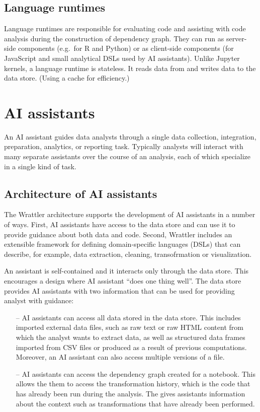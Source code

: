 \documentclass[sigplan,preprint,10pt]{acmart}\settopmatter{printfolios=true,printccs=false,printacmref=false}
\theoremstyle{plain}
\theoremstyle{definition}
\begin{document}
\subsection{Language runtimes}

Language runtimes are responsible for evaluating code and assisting with code analysis during
the construction of dependency graph. They can run as server-side components (e.g.~for R and Python) 
or as client-side components (for JavaScript and small analytical DSLs used by AI assistants). 
Unlike Jupyter kernels, a language runtime is stateless. It reads data from and writes data to
the data store. (Using a cache for efficiency.)

\section{AI assistants}
\label{sec:ai}

An AI assistant guides data analysts through a single data collection, integration, preparation, 
analytics, or reporting task. Typically analysts will interact with many separate assistants over 
the course of an analysis, each of which specialize in a single kind of task.

\subsection{Architecture of AI assistants}

The Wrattler architecture supports the development of AI assistants in a number of ways. First, AI
assistants have access to the data store and can use it to provide guidance about both data and 
code. Second, Wrattler includes an extensible framework for defining domain-specific languages 
(DSLs) that can describe, for example, data extraction, cleaning, transofrmation or visualization.

An assistant is self-contained and it interacts only through the data store. This encourages a 
design where AI assistant ``does one thing well''.  The data store provides AI assistants with 
two information that can be used for providing analyst with guidance:
%
\begin{itemize}
\item[--] AI assistants can access all data stored in the data
store. This includes imported external data files, such as raw text or raw HTML content from which
the analyst wants to extract data, as well as structured data frames imported from CSV files or
produced as a result of previous computations. Moreover, an AI assistant can also access multiple
versions of a file.
\vspace{0.25em}

\item[--] AI assistants can access the dependency graph created for a 
notebook. This allows the them to access the transformation history, which is the code 
that has already been run during the analysis. The gives assistants information about the
context such as transformations that have already been performed.
\end{itemize}
\end{document}
